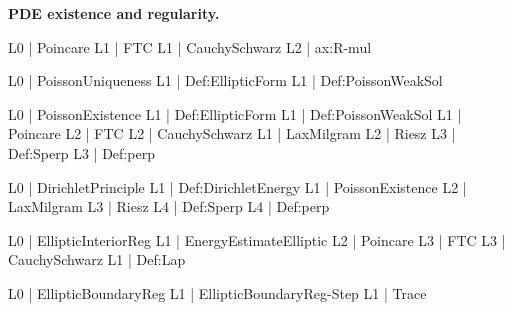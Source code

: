 \documentclass[11pt,reqno]{amsart}
\begin{document}
	\medskip
	
	\noindent\textbf{PDE existence and regularity.}
	
	\noindent%
	\begin{minipage}[t]{0.48\linewidth}
		\vspace{0pt}
		\begin{verbatimbox}
			L0 | Poincare
			L1 |   FTC
			L1 |   CauchySchwarz
			L2 |     ax:R-mul
		\end{verbatimbox}
	\end{minipage}\hfill
	\begin{minipage}[t]{0.48\linewidth}
		\vspace{0pt}
		\begin{verbatimbox}
			L0 | PoissonUniqueness
			L1 |   Def:EllipticForm
			L1 |   Def:PoissonWeakSol
		\end{verbatimbox}
	\end{minipage}
	
	\medskip
	
	\noindent%
	\begin{minipage}[t]{0.48\linewidth}
		\vspace{0pt}
		\begin{verbatimbox}
			L0 | PoissonExistence
			L1 |   Def:EllipticForm
			L1 |   Def:PoissonWeakSol
			L1 |   Poincare
			L2 |     FTC
			L2 |     CauchySchwarz
			L1 |   LaxMilgram
			L2 |     Riesz
			L3 |       Def:Sperp
			L3 |       Def:perp
		\end{verbatimbox}
	\end{minipage}\hfill
	\begin{minipage}[t]{0.48\linewidth}
		\vspace{0pt}
		\begin{verbatimbox}
			L0 | DirichletPrinciple
			L1 |   Def:DirichletEnergy
			L1 |   PoissonExistence
			L2 |     LaxMilgram
			L3 |       Riesz
			L4 |         Def:Sperp
			L4 |         Def:perp
		\end{verbatimbox}
	\end{minipage}
	
	\medskip
	
	\noindent%
	\begin{minipage}[t]{0.48\linewidth}
		\vspace{0pt}
		\begin{verbatimbox}
			L0 | EllipticInteriorReg
			L1 |   EnergyEstimateElliptic
			L2 |     Poincare
			L3 |       FTC
			L3 |       CauchySchwarz
			L1 |   Def:Lap
		\end{verbatimbox}
	\end{minipage}\hfill
	\begin{minipage}[t]{0.48\linewidth}
		\vspace{0pt}
		\begin{verbatimbox}
			L0 | EllipticBoundaryReg
			L1 |   EllipticBoundaryReg-Step
			L1 |   Trace
		\end{verbatimbox}
	\end{minipage}
	
\end{document}
